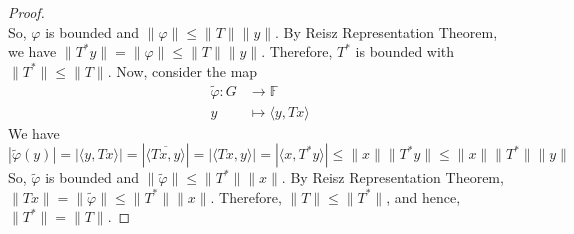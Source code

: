 \documentclass{report}
\begin{document}
\begin{proof}
$$  $$
  So, $\varphi$ is bounded and $\lVert\varphi\rVert\leq\lVert T\rVert\lVert y\rVert$. By Reisz Representation Theorem, we have $\lVert T^{*}y\rVert=\lVert\varphi\rVert\leq\lVert T\rVert\lVert y\rVert$. Therefore, $T^{*}$ is bounded with $\lVert T^{*}\rVert\leq\lVert T\rVert$. Now, consider the map
  $$
  \begin{aligned}
    \tilde{\varphi}:G&\longrightarrow\mathbb{F} \\
    y&\longmapsto\langle y,Tx\rangle
  \end{aligned}
  $$
  We have
  $$
  |\tilde{\varphi}(y)| = |\langle y,Tx\rangle| = |\overline{\langle Tx,y\rangle}| = |\langle Tx,y\rangle| = |\langle x,T^{*}y\rangle|\leq\lVert x\rVert\lVert T^{*}y\rVert\leq\lVert x\rVert\lVert T^{*}\rVert\lVert y\rVert
  $$
  So, $\tilde{\varphi}$ is bounded and $\lVert\tilde{\varphi}\rVert\leq\lVert T^{*}\rVert\lVert x\rVert$. By Reisz Representation Theorem, $\lVert Tx\rVert=\lVert\tilde{\varphi}\rVert\leq\lVert T^{*}\rVert\lVert x\rVert$. Therefore, $\lVert T\rVert\leq\lVert T^{*}\rVert$, and hence, $\lVert T^{*}\rVert = \lVert T\rVert$.
\end{proof}
\end{document}
